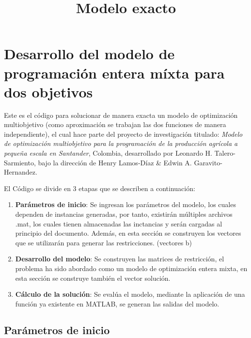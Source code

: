\documentclass[11pt]{article}
\title{Modelo exacto}
\providecommand{\tightlist}{%
      \setlength{\itemsep}{0pt}\setlength{\parskip}{0pt}}
\begin{document}
    
    
    \maketitle
    
    

    
    \hypertarget{desarrollo-del-modelo-de-programaciuxf3n-entera-muxedxta-para-dos-objetivos}{%
\section{Desarrollo del modelo de programación entera míxta para dos
objetivos}\label{desarrollo-del-modelo-de-programaciuxf3n-entera-muxedxta-para-dos-objetivos}}

    Este es el código para solucionar de manera exacta un modelo de
optimización multiobjetivo (como aproximación se trabajan las dos
funciones de manera independiente), el cual hace parte del proyecto de
investigación titulado: \emph{Modelo de optimización multiobjetivo para
la programación de la producción agrícola a pequeña escala en
Santander}, Colombia, desarrollado por Leonardo H. Talero-Sarmiento,
bajo la dirección de Henry Lamos-Díaz \& Edwin A. Garavito-Hernandez.

El Código se divide en 3 etapas que se describen a continuación:

\begin{enumerate}
\def\labelenumi{\arabic{enumi}.}
\tightlist
\item
  \textbf{Parámetros de inicio}: Se ingresan los parámetros del modelo,
  los cuales dependen de instancias generadas, por tanto, existirán
  múltiples archivos .mat, los cuales tienen almacenadas las inctancias
  y serán cargadas al principio del documento. Además, en esta sección
  se construyen los vectores que se utilizarán para generar las
  restricciones. (vectores b)
\item
  \textbf{Desarrollo del modelo}: Se construyen las matrices de
  restricción, el problema ha sido abordado como un modelo de
  optimización entera mixta, en esta sección se construye también el
  vector solución.
\item
  \textbf{Cálculo de la solución}: Se evalúa el modelo, mediante la
  aplicación de una función ya existente en MATLAB, se generan las
  salidas del modelo.
\end{enumerate}

    \hypertarget{paruxe1metros-de-inicio}{%
\subsection{Parámetros de inicio}\label{paruxe1metros-de-inicio}}
\end{document}
